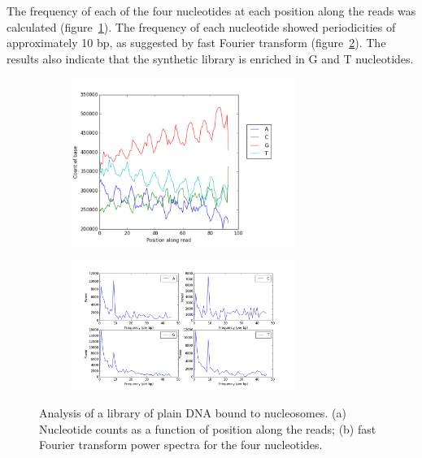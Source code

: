 \documentclass[a4paper, numbers=noenddot]{scrbook}
\begin{document}
The frequency of each of the four nucleotides at each position along the reads was calculated (figure~\ref{fig:enriched_counts}). The frequency of each nucleotide showed periodicities of approximately 10 bp, as suggested by fast Fourier transform (figure~\ref{fig:enriched_power}).  The results also indicate that the synthetic library is enriched in G and T nucleotides.

\begin{figure}[htbp]
  \centering
  \begin{subfigure}[htbp]{0.8\textwidth}
    \centering
    \includegraphics[width=0.8\textwidth]{enriched-counts}
    \caption{}
    \label{fig:enriched_counts}
  \end{subfigure}
  \begin{subfigure}[htbp]{0.8\textwidth}
    \centering
    \includegraphics[width=0.8\textwidth]{enriched-power}
    \caption{}
    \label{fig:enriched_power}
  \end{subfigure}
  \caption{Analysis of a library of plain DNA bound to nucleosomes. (a) Nucleotide counts as a function of position along the reads; (b) fast Fourier transform power spectra for the four nucleotides.}
  \label{fig:enriched}
\end{figure}
\end{document}

